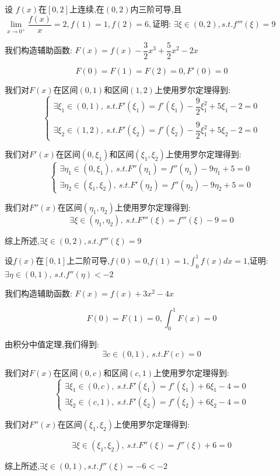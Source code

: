 \begin{proposition}
	设 $f(x)$在$[0,2]$上连续,在$(0,2)$内三阶可导,且$\lim\limits_{x\rightarrow 0^{+}}\dfrac{f(x)}{x}=2,f(1)=1,f(2)=6,$证明: $\exists \xi\in(0,2), s.t. f'''(\xi)=9$
\end{proposition}
\begin{solution}

	我们构造辅助函数:  $F(x)=f(x)-\dfrac{3}{2}x^3+\dfrac{5}{2}x^2-2x$

	$$F(0)=F(1)=F(2)=0,F'(0)=0$$

	我们对$F(x)$在区间$(0,1)$和区间$(1,2)$上使用罗尔定理得到:
	$$\left\lbrace
		\begin{array}{l}
			\exists \xi_{1}\in(0,1),\ s.t. F'(\xi_{1})=f'(\xi_{1})-\dfrac{9}{2}\xi_{1}^2+5\xi_{1}-2=0 \\
			\\
			\exists \xi_{2}\in(1,2),\ s.t. F'(\xi_{2})=f'(\xi_{2})-\dfrac{9}{2}\xi_{1}^2+5\xi_{2}-2=0
		\end{array}
		\right. $$

	我们对$F'(x)$在区间$(0,\xi_{1})$和区间$(\xi_{1},\xi_{2})$上使用罗尔定理得到:
	$$\left\lbrace
		\begin{array}{l}
			\exists \eta_{1}\in(0,\xi_{1}),\ s.t. F''(\eta_{1})=f''(\eta_{1})-9\eta_{1}+5=0 \\
			\exists \eta_{2}\in(\xi_{1},\xi_{2}),\ s.t. F'(\eta_{2})=f''(\eta_{2})-9\eta_{2}+5=0
		\end{array}
		\right. $$

	我们对$F''(x)$在区间$(\eta_{1},\eta_{2})$上使用罗尔定理得到:
	$$\exists \xi\in(\eta_{1},\eta_{2}),\ s.t. F'''(\xi)=f'''(\xi)-9=0$$

	综上所述,$\exists \xi\in(0,2), s.t. f'''(\xi)=9$
\end{solution}


\begin{proposition}
	设$f(x)$在$[0,1]$上二阶可导,$f(0)=0$,$f(1)=1$,$\int_{0}^{1}f(x)dx=1$,证明: $\exists \eta\in(0,1)$, $s.t. f''(\eta)<-2$
\end{proposition}
\begin{solution}

	我们构造辅助函数:  $F(x)=f(x)+3x^2-4x$

	$$F(0)=F(1)=0,\int_{0}^{1}F(x)=0$$

	由积分中值定理,我们得到:
	$$\exists c\in(0,1), \ s.t. F(c)=0$$

	我们对$F(x)$在区间$(0,c)$和区间$(c,1)$上使用罗尔定理得到:
	$$\left\lbrace
		\begin{array}{l}
			\exists \xi_{1}\in(0,c),\ s.t. F'(\xi_{1})=f'(\xi_{1})+6\xi_{1}-4=0 \\
			\exists \xi_{2}\in(c,1),\ s.t. F'(\xi_{2})=f'(\xi_{2})+6\xi_{2}-4=0
		\end{array}
		\right. $$

	我们对$F''(x)$在区间$(\xi_{1},\xi_{2})$上使用罗尔定理得到:

	$$\exists \xi\in(\xi_{1},\xi_{2}),\ s.t. F''(\xi)=f''(\xi)+6=0$$

	综上所述,$\exists \xi\in(0,1), s.t. f''(\xi)=-6<-2$
\end{solution}

